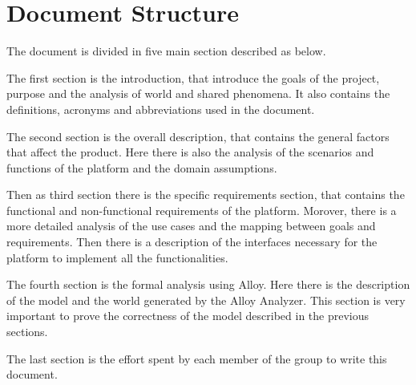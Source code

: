 \section{Document Structure}
\label{s:Document_Structure}%

The document is divided in five main section described as below.

The first section is the introduction, that introduce the goals of the project, purpose and the analysis of world and shared phenomena. It also contains the definitions, acronyms and abbreviations used in the document. 

The second section is the overall description, that contains the general factors that affect the product. Here there is also the analysis of the scenarios and functions of the platform and the domain assumptions.

Then as third section there is the specific requirements section, that contains the functional and non-functional requirements of the platform. Morover, there is a more detailed analysis of the use cases and the mapping between goals and requirements. Then there is a description of the interfaces necessary for the platform to implement all the functionalities.

The fourth section is the formal analysis using Alloy. Here there is the description of the model and the world generated by the Alloy Analyzer. This section is very important to prove the correctness of the model described in the previous sections.

The last section is the effort spent by each member of the group to write this document.
